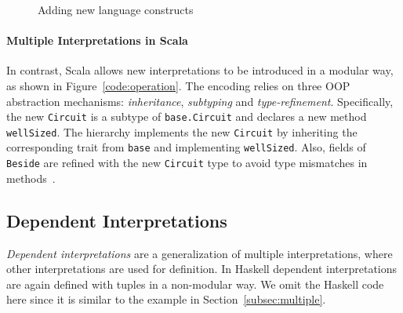 \begin{figure}
\caption{Adding new language constructs}
\label{code:variant}
\end{figure}

\paragraph{Multiple Interpretations in Scala}
In contrast, Scala allows new interpretations to be introduced in a 
modular way, as shown in Figure~\ref{code:operation}.
The encoding relies on three OOP abstraction mechanisms:
\emph{inheritance}, \emph{subtyping} and \emph{type-refinement}.
Specifically, the new \lstinline{Circuit} is a subtype of
\lstinline{base.Circuit} and declares a new method \lstinline{wellSized}.
The hierarchy implements the new \lstinline{Circuit} by inheriting the corresponding trait from \lstinline{base} and
implementing \lstinline{wellSized}.
Also, fields of \lstinline{Beside} are refined with the new \lstinline{Circuit} type
to avoid type mismatches in methods~\cite{eptrivially16}.


\begin{comment}
We can even define \lstinline{wellSized} independently:
\begin{lstlisting}
trait Circuit { def wellSized: Boolean }
trait Id extends Circuit { ... }
...
\end{lstlisting}
And merge the two hierarchies through \emph{multiple inheritance} for providing
multiple interpretations:
\begin{lstlisting}
trait Circuit
    extends width.Circuit with wellSized.Circuit
trait Id extends Circuit
    with width.Id with wellSized.Circuit
...
\end{lstlisting}
\end{comment}

\subsection{Dependent Interpretations}
 \emph{Dependent interpretations} are a generalization of multiple
interpretations, where other interpretations are used for definition.
In Haskell dependent interpretations are again defined with
tuples in a non-modular way. We omit the Haskell code here since
it is similar to the example in Section~\ref{subsec:multiple}.

